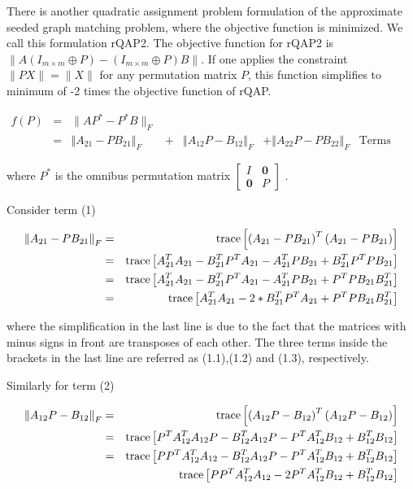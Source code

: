 \documentclass[12pt,oneside,final]{thesis}\usepackage[]{graphicx}\usepackage[]{color}
\begin{document}
There is another quadratic assignment problem formulation of  the approximate seeded graph matching problem, where the objective function is  minimized. We call this formulation rQAP2.
The objective function for rQAP2 is
$\|A(I_{m \times m}\oplus P)-(I_{m \times m}\oplus P)B\|$. If one applies the constraint $\|PX\|=\|X\|$ for any permutation matrix $P$, this function simplifies to minimum of -2 times the objective function of  rQAP.

\begin{align*}
f(P) & = & \lVert AP^{*}-P^{*}B\rVert _{F}\\
 & = & \left\Vert A_{21}-PB_{21}\right\Vert _{F} & + & \left\Vert A_{12}P-B_{12}\right\Vert _{F} & +\left\Vert A_{22}P-PB_{22}\right\Vert _{F} & \textrm{Terms (1), (2) and (3)}
\end{align*}


where $P^{*}$ is the omnibus permutation matrix $\left[\begin{array}{cc}
I & \mathbf{0}\\
\mathbf{0} & P
\end{array}\right]$ .


Consider term (1)

\begin{align*}
\left\Vert A_{21}-PB_{21}\right\Vert _{F} & = & \textup{trace}\left[\left(A_{21}-PB_{21}\right)^{T}\left(A_{21}-PB_{21}\right)\right]\\
 & = & \textup{trace}\left[A_{21}^{T}A_{21}-B_{21}^{T}P^{T}A_{21}-A_{21}^{T}PB_{21}+B_{21}^{T}P^{T}PB_{21}\right]\\
 & = & \textup{trace}\left[A_{21}^{T}A_{21}-B_{21}^{T}P^{T}A_{21}-A_{21}^{T}PB_{21}+P^{T}PB_{21}B_{21}^{T}\right]\\
 & = & \textup{trace}\left[A_{21}^{T}A_{21}-2*B_{21}^{T}P^{T}A_{21}+P^{T}PB_{21}B_{21}^{T}\right]
\end{align*}


where the simplification in the last line is due to the fact that
the matrices with minus signs in front are transposes of each other.
The three terms inside the brackets in the last line are referred
as (1.1),(1.2) and (1.3), respectively.

Similarly for term (2)

\begin{align*}
\left\Vert A_{12}P-B_{12}\right\Vert _{F} & = & \textup{trace}\left[\left(A_{12}P-B_{12}\right)^{T}\left(A_{12}P-B_{12}\right)\right]\\
 & = & \textup{trace}\left[P^{T}A_{12}^{T}A_{12}P-B_{12}^{T}A_{12}P-P^{T}A_{12}^{T}B_{12}+B_{12}^{T}B_{12}\right]\\
 & = & \textup{trace}\left[PP^{T}A_{12}^{T}A_{12}-B_{12}^{T}A_{12}P-P^{T}A_{12}^{T}B_{12}+B_{12}^{T}B_{12}\right]\\
 &  & \textup{trace}\left[PP^{T}A_{12}^{T}A_{12}-2P^{T}A_{12}^{T}B_{12}+B_{12}^{T}B_{12}\right]
\end{align*}
\end{document}
